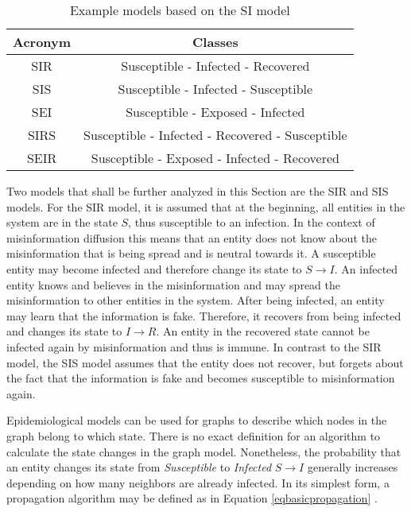 \begin{table}[ht!]
    \centering
    \begin{tabular}{|c | c |} 
     \hline
     Acronym & Classes  \\ 
     \hline
     SIR & Susceptible - Infected - Recovered  \\ 
     \hline
     SIS & Susceptible - Infected - Susceptible \\
     \hline
     SEI & Susceptible - Exposed - Infected \\
     \hline
     SIRS & Susceptible - Infected - Recovered - Susceptible \\
     \hline
     SEIR & Susceptible - Exposed - Infected - Recovered \\
     \hline
    \end{tabular}
    \caption{Example models based on the SI 
    model  \cite{reviewinformationdiffusion}}
    \label{SI-table}
\end{table}

Two models that shall be further analyzed in this Section are the SIR and SIS models. 
For the SIR model, it is assumed that at the beginning, all entities in the 
system are in the state $S$, thus susceptible to an infection. In the context of 
misinformation diffusion this means that an entity does not know about the
misinformation that is being spread and is neutral towards it. A susceptible
entity may become infected and therefore change its state to $S\to I$.
An infected entity knows and believes in the misinformation and may
spread the misinformation to other entities in the system. After being infected,
an entity may learn that the information is fake. Therefore, it recovers 
from being infected and changes its state to $I\to R$. An entity in the 
recovered state cannot be infected again by misinformation and thus is immune.
In contrast to the SIR model, the SIS model assumes that
the entity does not recover,
but \glqq forgets\grqq{} about the fact that the information is fake 
and becomes susceptible to misinformation again.

Epidemiological models can be used for graphs to describe which nodes 
in the graph belong to which state.
There is no exact definition for an algorithm to calculate the state 
changes in the graph model. Nonetheless, the probability that an entity changes
its state from \textit{Susceptible} to \textit{Infected} 
$S \to I$ generally increases depending on
how many neighbors are already infected. In its simplest form, a
propagation algorithm may be defined as in Equation \ref{eqbasicpropagation} 
\cite{easypropagation}.

